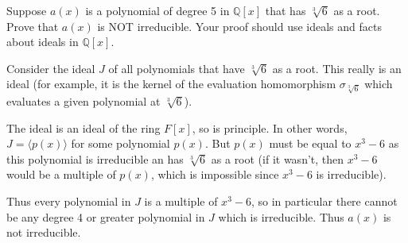 \documentclass[10pt]{exam}
\def\Q{\mathbb Q}
\begin{document}
\clearpage
\begin{questions}

\question[6] Suppose $a(x)$ is a polynomial of degree 5 in $\Q[x]$ that has $\sqrt[3]{6}$ as a root.  Prove that $a(x)$ is NOT irreducible.  Your proof should use ideals and facts about ideals in $\Q[x]$.

\begin{solution}
Consider the ideal $J$ of all polynomials that have $\sqrt[3]{6}$ as a root.  This really is an ideal (for example, it is the kernel of the evaluation homomorphism $\sigma_{\sqrt[3]{6}}$ which evaluates a given polynomial at $\sqrt[3]{6}$).

The ideal is an ideal of the ring $F[x]$, so is principle.  In other words, $J = \langle p(x)\rangle$ for some polynomial $p(x)$.  But $p(x)$ must be equal to $x^3 - 6$ as this polynomial is irreducible an has $\sqrt[3]{6}$ as a root (if it wasn't, then $x^3 - 6$ would be a multiple of $p(x)$, which is impossible since $x^3 - 6$ is irreducible).  

Thus every polynomial in $J$ is a multiple of $x^3 - 6$, so in particular there cannot be any degree 4 or greater polynomial in $J$ which is irreducible.  Thus $a(x)$ is not irreducible.
\end{solution}
\vfill
\clearpage






\end{questions}
\end{document}
